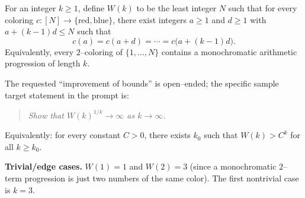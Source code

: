 \begin{definition}
For an integer $k\ge 1$, define $W(k)$ to be the least integer $N$ such that for every coloring
$c:[N]\to\{\text{red},\text{blue}\}$, there exist integers $a\ge 1$ and $d\ge 1$ with
$a+(k-1)d\le N$ such that
\[
 c(a)=c(a+d)=\cdots=c\bigl(a+(k-1)d\bigr).
\]
Equivalently, every $2$--coloring of $\{1,\dots,N\}$ contains a monochromatic arithmetic progression of length $k$.
\end{definition}

The requested ``improvement of bounds'' is open--ended; the specific sample target statement in the prompt is:

\begin{quote}
\emph{Show that $W(k)^{1/k}\to\infty$ as $k\to\infty$.}
\end{quote}

Equivalently: for every constant $C>0$, there exists $k_0$ such that $W(k)>C^k$ for all $k\ge k_0$.

\medskip
\noindent\textbf{Trivial/edge cases.}
$W(1)=1$ and $W(2)=3$ (since a monochromatic $2$--term progression is just two numbers of the same color).
The first nontrivial case is $k=3$.
